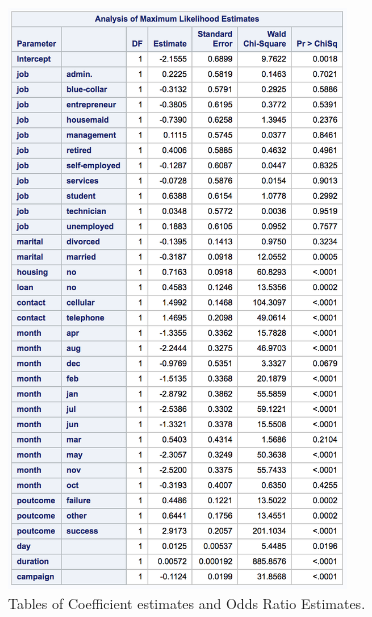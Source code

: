 \documentclass[]{article}
\begin{document}
\begin{figure}
  \centering
    \includegraphics[width=0.8\textwidth]{images/fig21a_coefficients.png} 
  \caption{Tables of Coefficient estimates and Odds Ratio Estimates.}
  \label{fig21a}
\end{figure}
\end{document}
